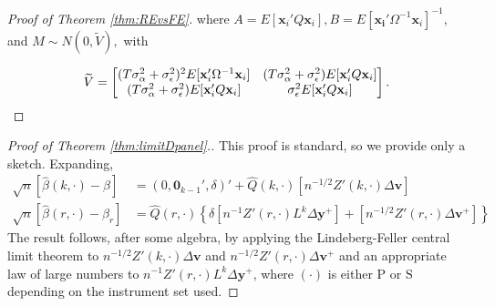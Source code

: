 \begin{proof}[Proof of Theorem \ref{thm:REvsFE}]
where $ A = E[\mathbf{x}_i' Q \mathbf{x}_i], B=E[\mathbf{x_i}' \Omega^{-1} \mathbf{x}_i]^{-1}$, and  $M \sim N(0, \widetilde{V}),$ with

\[
\widetilde{V} =  \begin{bmatrix}
(T\sigma_\alpha^2 + \sigma_\epsilon^2)^2 E[\mathbf{x}_i' \Omega^{-1} \mathbf{x}_i] & (T\sigma_\alpha^2 + \sigma_\epsilon^2) E[\mathbf{x}_i' Q \mathbf{x}_i] \\
 (T\sigma_\alpha^2 + \sigma_\epsilon^2) E[\mathbf{x}_i' Q \mathbf{x}_i] & \sigma_\epsilon^2 E[\mathbf{x}_i' Q \mathbf{x}_i]
\end{bmatrix}. \\
\]

\end{proof}

\begin{proof}[Proof of Theorem \ref{thm:limitDpanel}.]
  This proof is standard, so we provide only a sketch.
Expanding, 
\begin{align*}
  \sqrt{n}\left[\widehat{\beta}(k,\cdot) - \beta\right] &=(0, \mathbf{0}_{k-1}', \delta)' + \widehat{Q}(k,\cdot)\left[ n^{-1/2}Z'(k,\cdot)\Delta \mathbf{v}\right]\\
  \sqrt{n}\left[\widehat{\beta}(r,\cdot) - \beta_{r}\right] &=  \widehat{Q}(r,\cdot)\left\{ \delta \left[n^{-1}Z'(r,\cdot) L^{k}\Delta \mathbf{y}^+\right] + \left[n^{-1/2}Z'(r,\cdot)\Delta \mathbf{v}^{+}\right] \right\}
\end{align*}
The result follows, after some algebra, by applying the Lindeberg-Feller central limit theorem to $n^{-1/2}Z'(k,\cdot)\Delta \mathbf{v}$ and $n^{-1/2}Z'(r,\cdot)\Delta \mathbf{v}^{+}$ and an appropriate law of large numbers to $n^{-1} Z'(r,\cdot)L^k \Delta \mathbf{y}^{+}$, where $(\cdot)$ is either $\text{P}$ or $\text{S}$ depending on the instrument set used.
\end{proof}


